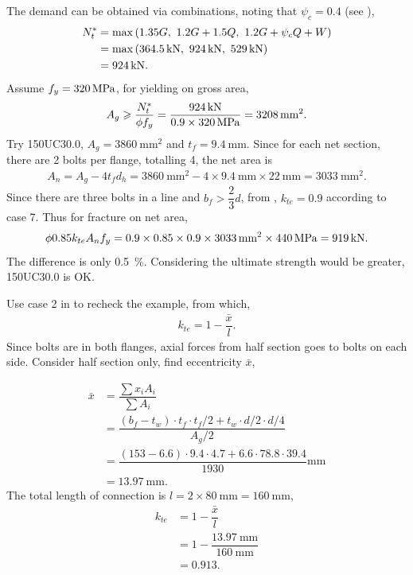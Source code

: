 \begin{solution}
The demand can be obtained via combinations, noting that $\psi_c=0.4$ (see ),
\begin{align*}
N^*_t&=\max\left(1.35G,~1.2G+1.5Q,~1.2G+\psi_cQ+W\right)\\
&=\max\left(\SI{364.5}{\kilo\newton},~\SI{924}{\kilo\newton},~\SI{529}{\kilo\newton}\right)\\
&=\SI{924}{\kilo\newton}.
\end{align*}
Assume $f_y=\SI{320}{\mega\pascal}$, for yielding on gross area,
\begin{gather*}
A_g\geqslant\dfrac{N^*_t}{\phi{}f_y}=\dfrac{\SI{924}{\kilo\newton}}{0.9\times\SI{320}{\mega\pascal}}=\SI{3208}{\milli\meter^2}.
\end{gather*}
Try 150UC30.0, $A_g=\SI{3860}{\mm^2}$ and $t_f=\SI{9.4}{\mm}$. Since for each net section, there are 2 bolts per flange, totalling 4, the net area is
\begin{gather*}
A_n=A_g-4t_fd_h=\SI{3860}{\mm^2}-4\times\SI{9.4}{\mm}\times\SI{22}{\mm}=\SI{3033}{\mm^2}.
\end{gather*}
Since there are three bolts in a line and $b_f>\dfrac{2}{3}d$, from , $k_{te}=0.9$ according to case 7. Thus for fracture on net area,
\begin{gather*}
\phi0.85k_{te}A_nf_y=0.9\times0.85\times0.9\times\SI{3033}{\milli\meter^2}\times\SI{440}{\mega\pascal}=\SI{919}{\kilo\newton}.
\end{gather*}
The difference is only \SI{0.5}{\percent}. Considering the ultimate strength would be greater, 150UC30.0 is OK.

Use case 2 in  to recheck the example, from which,
\begin{gather*}
k_{te}=1-\dfrac{\bar{x}}{l}.
\end{gather*}
Since bolts are in both flanges, axial forces from half section goes to bolts on each side. Consider half section only, find eccentricity $\bar{x}$,

\begin{minipage}{6cm}
\centering
\end{minipage}
\begin{minipage}{.99\linewidth-6cm}
\begin{align*}
\bar{x}&=\dfrac{\sum{}x_iA_i}{\sum{}A_i}\\&=\dfrac{\left(b_f-t_w\right)\cdot{}t_f\cdot{}t_f/2+t_w\cdot{}d/2\cdot{}d/4}{A_g/2}\\
&=\dfrac{\left(153-6.6\right)\cdot{}9.4\cdot{}4.7+6.6\cdot{}78.8\cdot{}39.4}{1930}\si{\mm}\\
&=\SI{13.97}{\mm}.
\end{align*}
The total length of connection is $l=2\times\SI{80}{\mm}=\SI{160}{\mm}$,
\begin{align*}
k_{te}&=1-\dfrac{\bar{x}}{l}\\
&=1-\dfrac{\SI{13.97}{\mm}}{\SI{160}{\mm}}\\
&=0.913.
\end{align*}
\end{minipage}


\end{solution}
